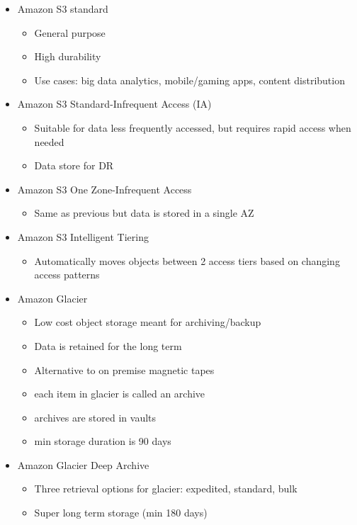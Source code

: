 \documentclass[]{scrartcl}
\begin{document}
\begin{itemize}
	\item Amazon S3 standard
	\begin{itemize}
		\item General purpose
		\item High durability
		\item Use cases: big data analytics, mobile/gaming apps, content distribution
	\end{itemize}
	\item Amazon S3 Standard-Infrequent Access (IA)
	\begin{itemize}
		\item Suitable for data less frequently accessed, but requires rapid access when needed
		\item Data store for DR
	\end{itemize}
	\item Amazon S3 One Zone-Infrequent Access
	\begin{itemize}
		\item Same as previous but data is stored in a single AZ
	\end{itemize}
	\item Amazon S3 Intelligent Tiering
	\begin{itemize}
		\item Automatically moves objects between 2 access tiers based on changing access patterns
	\end{itemize}
	\item Amazon Glacier
	\begin{itemize}
		\item Low cost object storage meant for archiving/backup
		\item Data is retained for the long term
		\item Alternative to on premise magnetic tapes
		\item each item in glacier is called an archive
		\item archives are stored in vaults
		\item min storage duration is 90 days
	\end{itemize}
	\item Amazon Glacier Deep Archive
	\begin{itemize}
		\item Three retrieval options for glacier: expedited, standard, bulk
		\item Super long term storage (min 180 days)
	\end{itemize}
\end{itemize}
\end{document}
